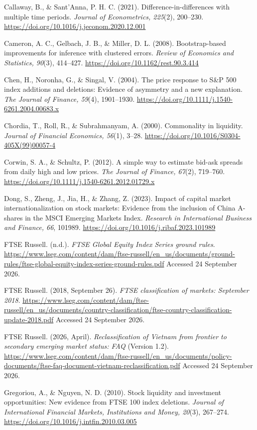 \documentclass[review,authoryear,12pt]{elsarticle}
\begin{document}
Callaway, B., \& Sant'Anna, P. H. C. (2021). Difference-in-differences
with multiple time periods. \emph{Journal of Econometrics, 225}(2),
200--230. \url{https://doi.org/10.1016/j.jeconom.2020.12.001}

Cameron, A. C., Gelbach, J. B., \& Miller, D. L. (2008). Bootstrap-based
improvements for inference with clustered errors. \emph{Review of
Economics and Statistics, 90}(3), 414--427.
\url{https://doi.org/10.1162/rest.90.3.414}

Chen, H., Noronha, G., \& Singal, V. (2004). The price response to S\&P
500 index additions and deletions: Evidence of asymmetry and a new
explanation. \emph{The Journal of Finance, 59}(4), 1901--1930.
\url{https://doi.org/10.1111/j.1540-6261.2004.00683.x}

Chordia, T., Roll, R., \& Subrahmanyam, A. (2000). Commonality in
liquidity. \emph{Journal of Financial Economics, 56}(1), 3--28.
\url{https://doi.org/10.1016/S0304-405X(99)00057-4}

Corwin, S. A., \& Schultz, P. (2012). A simple way to estimate bid-ask
spreads from daily high and low prices. \emph{The Journal of Finance,
67}(2), 719--760. \url{https://doi.org/10.1111/j.1540-6261.2012.01729.x}

Dong, S., Zheng, J., Jia, H., \& Zhang, Z. (2023). Impact of capital
market internationalization on stock markets: Evidence from the
inclusion of China A-shares in the MSCI Emerging Markets Index.
\emph{Research in International Business and Finance, 66}, 101989.
\url{https://doi.org/10.1016/j.ribaf.2023.101989}

FTSE Russell. (n.d.). \emph{FTSE Global Equity Index Series ground
rules}.
\url{https://www.lseg.com/content/dam/ftse-russell/en_us/documents/ground-rules/ftse-global-equity-index-series-ground-rules.pdf}
Accessed 24 September 2026.

FTSE Russell. (2018, September 26). \emph{FTSE classification of
markets: September 2018}.
\url{https://www.lseg.com/content/dam/ftse-russell/en_us/documents/country-classification/ftse-country-classification-update-2018.pdf}
Accessed 24 September 2026.

FTSE Russell. (2026, April). \emph{Reclassification of Vietnam from
frontier to secondary emerging market status: FAQ} (Version 1.2).
\url{https://www.lseg.com/content/dam/ftse-russell/en_us/documents/policy-documents/ftse-faq-document-vietnam-reclassification.pdf}
Accessed 24 September 2026.

Gregoriou, A., \& Nguyen, N. D. (2010). Stock liquidity and investment
opportunities: New evidence from FTSE 100 index deletions. \emph{Journal
of International Financial Markets, Institutions and Money, 20}(3),
267--274. \url{https://doi.org/10.1016/j.intfin.2010.03.005}
\end{document}
